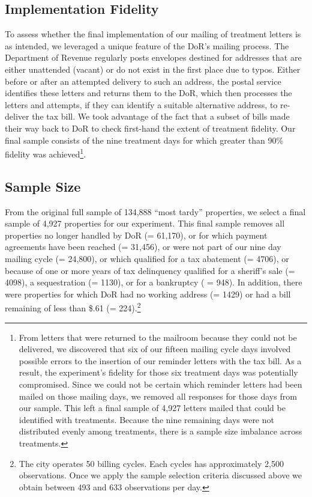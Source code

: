 \documentclass[12pt,titlepage]{article}
\begin{document}
\subsection{Implementation Fidelity}

To assess whether the final implementation of our mailing of treatment
letters is as intended, we leveraged a unique feature of the DoR's
mailing process.  The Department of Revenue regularly posts envelopes
destined for addresses that are either unattended (vacant) or do not
exist in the first place due to typos. Either before or after an
attempted delivery to such an address, the postal service identifies
these letters and returns them to the DoR, which then processes the
letters and attempts, if they can identify a suitable alternative
address, to re-deliver the tax bill. We took advantage of the fact
that a subset of bills made their way back to DoR to check first-hand
the extent of treatment fidelity. Our final sample consists of the
nine treatment days for which greater than 90\% fidelity was
achieved\footnote{From letters that were returned to the 
mailroom because they could not be delivered, we discovered that six 
of our fifteen mailing cycle days involved possible errors to the 
insertion of our reminder letters with the tax bill.  As a result, 
the experiment's fidelity for those six treatment days was 
potentially compromised.  Since we could not be certain which 
reminder letters had been mailed on those mailing days, we removed 
all responses for those days from our sample.  This left a final 
sample of 4,927 letters mailed that could be identified with 
treatments.  Because the nine remaining days were not distributed 
evenly among treatments, there is a sample size imbalance across treatments.}.

\subsection{Sample Size}

From the original full sample of 134,888 ``most tardy'' properties, we
select a final sample of 4,927 properties for our experiment.  This
final sample removes all properties no longer handled by DoR (=
61,170), or for which payment agreements have been reached (= 31,456),
or were not part of our nine day mailing cycle (= 24,800), or which
qualified for a tax abatement (= 4706), or because of one or more
years of tax delinquency qualified for a sheriff's sale (= 4098), a
sequestration (= 1130), or for a bankruptcy ( = 948).  In addition,
there were properties for which DoR had no working address (= 1429) or
had a bill remaining of less than \$.61 (= 224).\footnote{The city
  operates 50 billing cycles. Each cycles has approximately 2,500
  observations.  Once we apply the sample selection criteria discussed
  above we obtain between 493 and 633 observations per day.}
\end{document}
